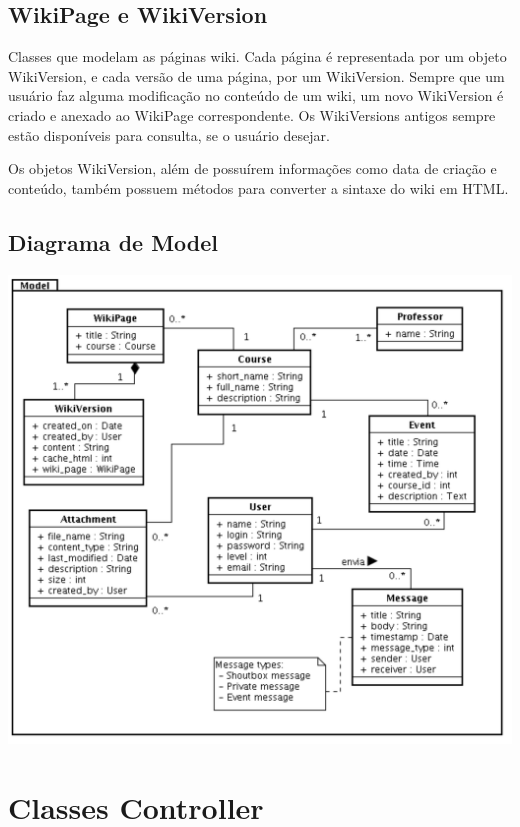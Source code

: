 \documentclass[11pt]{article}
\begin{document}
\subsection{WikiPage e WikiVersion}

Classes que modelam as páginas wiki. Cada página é representada por um objeto WikiVersion, e cada
versão de uma página, por um WikiVersion. Sempre que um usuário faz alguma modificação no conteúdo
de um wiki, um novo WikiVersion é criado e anexado ao WikiPage correspondente. Os WikiVersions
antigos sempre estão disponíveis para consulta, se o usuário desejar.

Os objetos WikiVersion, além de possuírem informações como data de criação e conteúdo, também
possuem métodos para converter a sintaxe do wiki em HTML.

\subsection{Diagrama de Model}

\includegraphics[width=150truemm]{classes-model.pdf}


\pagebreak

\section{Classes Controller}
\end{document}
